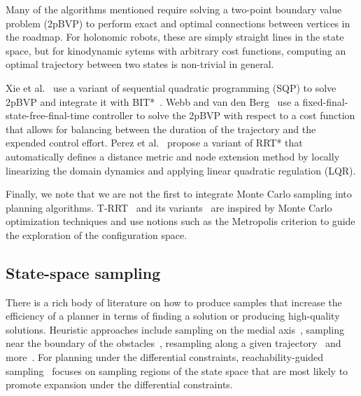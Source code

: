 \documentclass[letterpaper, 10 pt, conference]{ieeeconf}  %
\begin{document}
Many of the algorithms mentioned require solving a two-point boundary value problem (2pBVP) to perform exact and optimal connections between vertices in the roadmap.
For holonomic robots, these are simply straight lines in the state space, but for kinodynamic sytems with arbitrary cost functions,  computing an optimal trajectory between two states is non-trivial in general.

Xie et al.~\cite{XBPA15} use a variant of sequential quadratic programming (SQP) to solve 2pBVP and integrate it with BIT*~\cite{GSB15}.
Webb and van den Berg~\cite{WB13} use a fixed-final-state-free-final-time controller to solve the 2pBVP  with respect to a cost function that allows for balancing between the duration of the trajectory and the expended control effort.
Perez et al.~\cite{PPKKL12} propose a variant of RRT* that automatically defines a distance metric and node extension method by locally linearizing
the domain dynamics and applying linear quadratic regulation (LQR).

Finally, we note that we are not the first to integrate Monte Carlo sampling into planning algorithms. T-RRT~\cite{JCS10} and its variants~\cite{DSC13} are inspired by Monte Carlo optimization techniques and use notions such as the Metropolis criterion to guide the exploration of the configuration space.

%


\subsection{State-space sampling}
\label{subsec:sampling}
There is a rich body of literature on how to produce samples that increase the efficiency of a planner in terms of finding a solution or producing high-quality solutions.
Heuristic approaches include
sampling on the medial axis~\cite{WAS99a, WAS99b, LTA03, YDLTA14},
sampling near the boundary of the obstacles~\cite{ABDJV98, YTEA12},
resampling along a given trajectory~\cite{APD11, AS11}
and more~\cite{US03, SWT09}.
For planning under the differential constraints,
reachability-guided sampling~\cite{SWT09, PLAEFRA17} focuses on sampling regions of the state space that are most likely to promote expansion under the differential constraints.
\end{document}
